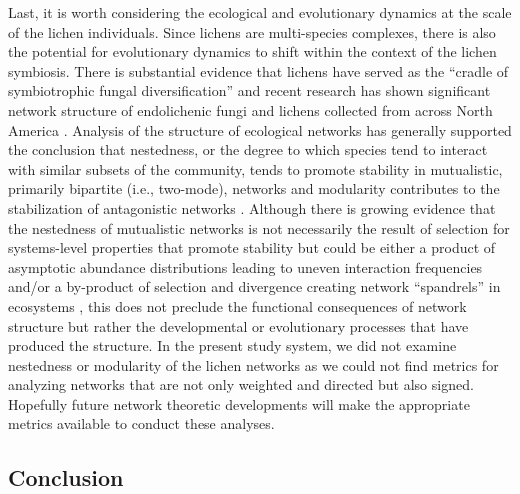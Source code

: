 \documentclass[fleqn,12pt]{olplainarticle}
\begin{document}
Last, it is worth considering the ecological and evolutionary dynamics
at the scale of the lichen individuals. Since lichens are
multi-species complexes, there is also the potential for evolutionary
dynamics to shift within the context of the lichen symbiosis. There is
substantial evidence that lichens have served as the ``cradle of
symbiotrophic fungal diversification''
\citep{Arnold2009ADiversification} and recent research has shown
significant network structure of endolichenic fungi and lichens
collected from across North America
\citep{Chagnon2016InteractionScale}. Analysis of the structure of
ecological networks has generally supported the conclusion that
nestedness, or the degree to which species tend to interact with
similar subsets of the community, tends to promote stability in
mutualistic, primarily bipartite (i.e., two-mode), networks and
modularity contributes to the stabilization of antagonistic networks
\citep{Elias2013EvolutionaryNetwork,
  Grilli2016ModularityCommunities}. Although there is growing evidence
that the nestedness of mutualistic networks is not necessarily the
result of selection for systems-level properties that promote
stability but could be either a product of asymptotic abundance
distributions leading to uneven interaction frequencies
\citep{Staniczenko2013TheNetworks} and/or a by-product of selection
and divergence creating network ``spandrels'' in ecosystems
\citep{Valverde2018TheSpandrel}, this does not preclude the functional
consequences of network structure but rather the developmental or
evolutionary processes that have produced the structure. In the
present study system, we did not examine nestedness or modularity of
the lichen networks as we could not find metrics for analyzing
networks that are not only weighted and directed but also
signed. Hopefully future network theoretic developments will make the
appropriate metrics available to conduct these analyses.



\subsection*{Conclusion}
\end{document}
